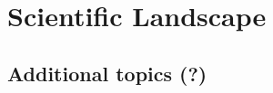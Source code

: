 \chapter{Scientific Landscape}
\label{ch:physics-atmpdk}














\section{Additional topics (?)}
\label{sec:landscape-addl}
